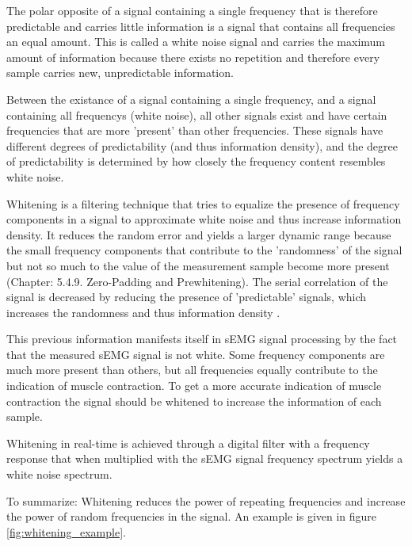 The polar opposite of a signal containing a single frequency that is therefore predictable and carries little information is a signal that contains all frequencies an equal amount. This is called a white noise signal and carries the maximum amount of information because there exists no repetition and therefore every sample carries new, unpredictable information.

Between the existance of a signal containing a single frequency, and a signal containing all frequencys (white noise), all other signals exist and have certain frequencies that are more 'present' than other frequencies. These signals have different degrees of predictability (and thus information density), and the degree of predictability is determined by how closely the frequency content resembles white noise.

Whitening is a filtering technique that tries to equalize the presence of frequency components in a signal to approximate white noise and thus increase information density. It reduces the random error and yields a larger dynamic range because the small frequency components that contribute to the 'randomness' of the signal but not so much to the value of the measurement sample become more present \cite{time_series_analysis_methods} (Chapter: 5.4.9. Zero-Padding and Prewhitening). The serial correlation of the signal is decreased by reducing the presence of 'predictable' signals, which increases the randomness and thus information density \cite{serial_correlation_definition}. 

This previous information manifests itself in sEMG signal processing by the fact that the measured sEMG signal is not white. Some frequency components are much more present than others, but all frequencies equally contribute to the indication of muscle contraction. To get a more accurate indication of muscle contraction the signal should be whitened to increase the information of each sample.

Whitening in real-time is achieved through a digital filter with a frequency response that when multiplied with the sEMG signal frequency spectrum yields a white noise spectrum.

To summarize: Whitening reduces the power of repeating frequencies and increase the power of random frequencies in the signal. An example is given in figure \ref{fig:whitening_example}.

